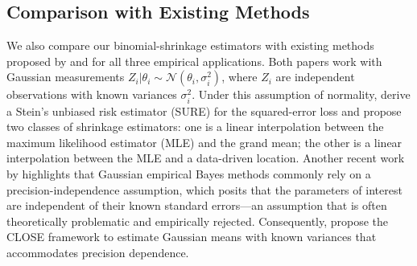 \documentclass[12pt,letterpaper]{article}
\begin{document}




\subsection{Comparison with Existing Methods}
We also compare our binomial-shrinkage estimators with existing methods proposed by \citet{xie2012sure} and \citet{chen2022empirical} for all three empirical applications. Both papers work with Gaussian measurements  $Z_i|\theta_i\sim\mathcal{N}(\theta_i,\sigma_i^2)$, where $Z_i$ are independent observations with known variances $\sigma_i^2$. Under this assumption of normality, \citet{xie2012sure} derive a Stein's unbiased risk estimator (SURE) for the squared-error loss and propose two classes of shrinkage estimators: one is a linear interpolation between the maximum likelihood estimator (MLE) and the grand mean; the other is a linear interpolation between the MLE and a data-driven location. Another recent work by \citet{chen2022empirical} highlights that Gaussian empirical Bayes methods commonly rely on a precision-independence assumption, which posits that the parameters of interest are independent of their known standard errors—an assumption that is often theoretically problematic and empirically rejected. Consequently, \citet{chen2022empirical} propose the CLOSE framework to estimate Gaussian means with known variances that accommodates precision dependence. 
\end{document}
